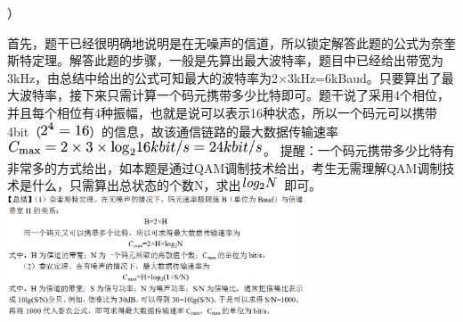 ）
\par{}
\begin{solution}首先，题干已经很明确地说明是在无噪声的信道，所以锁定解答此题的公式为奈奎斯特定理。解答此题的步骤，一般是先算出最大波特率，题目中已经给出带宽为3kHz，由总结中给出的公式可知最大的波特率为2×3kHz=6kBaud。只要算出了最大波特率，接下来只需计算一个码元携带多少比特即可。题干说了采用4个相位，并且每个相位有4种振幅，也就是说可以表示16种状态，所以一个码元可以携带4bit（\includegraphics[width=0.56250in,height=0.16667in]{texmath/aaccb55Cdpi7B3507D25E43D16}）的信息，故该通信链路的最大数据传输速率\includegraphics[width=3.00000in,height=0.17708in]{texmath/5dd0b05Cdpi7B3507D7BC_7B5Cmax7D7D3D25Ctimes35Ctimes7B5Clog_27D16kbit2Fs3D24kbit2Fs}。
提醒：一个码元携带多少比特有非常多的方式给出，如本题是通过QAM调制技术给出，考生无需理解QAM调制技术是什么，只需算出总状态的个数N，求出\includegraphics[width=0.45833in,height=0.14583in]
{texmath/b7c31d5Cdpi7B3507Dlog_2N}
即可。
\includegraphics[width=3.46875in,height=1.40625in]{computerassets/C4BCB29C720DA803C2491CE5A88154C0.png}
\end{solution}

